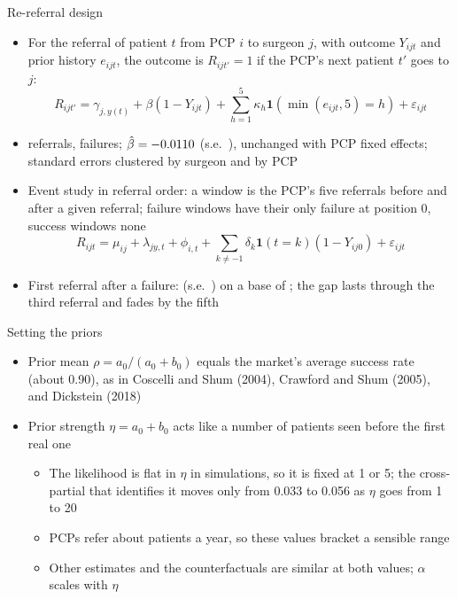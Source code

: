 \documentclass[aspectratio=169,11pt]{beamer}
\begin{document}
\begin{frame}[noframenumbering,label=bk-rereferral]{Re-referral design}
  \small
  \begin{itemize}\setlength{\itemsep}{3pt}
    \item For the referral of patient $t$ from PCP $i$ to surgeon $j$, with outcome $Y_{ijt}$ and prior history $e_{ijt}$, the outcome is $R_{ijt'} = 1$ if the PCP's next patient $t'$ goes to $j$:
    $$R_{ijt'} = \gamma_{j,y(t)} + \beta (1-Y_{ijt}) + \sum_{h=1}^{5} \kappa_h \mathbf{1}\left(\min(e_{ijt},5)=h\right) + \varepsilon_{ijt}$$
    \item \rereferEvents{} referrals, \rereferFailures{} failures; $\hat\beta = -0.0110{}$ (s.e.~\rereferSE{}), unchanged with PCP fixed effects; standard errors clustered by surgeon and by PCP
    \item Event study in referral order: a window is the PCP's five referrals before and after a given referral; failure windows have their only failure at position 0, success windows none
    $$R_{ijt} = \mu_{ij} + \lambda_{j y, t} + \phi_{i, t} + \sum_{k \neq -1} \delta_k \mathbf{1}(t=k) (1-Y_{ij0}) + \varepsilon_{ijt}$$
    \item First referral after a failure: \rereferESFirst{} (s.e.~\rereferESFirstSE{}) on a base of \rereferESBase{}; the gap lasts through the third referral and fades by the fifth
  \end{itemize}
\end{frame}

\begin{frame}[noframenumbering,label=bk-priors]{Setting the priors}
  \begin{itemize}\setlength{\itemsep}{9pt}
    \item Prior mean $\rho = a_0/(a_0+b_0)$ equals the market's average success rate (about 0.90), as in Coscelli and Shum (2004), Crawford and Shum (2005), and Dickstein (2018)
    \item Prior strength $\eta = a_0 + b_0$ acts like a number of patients seen before the first real one
      \begin{itemize}
        \item The likelihood is flat in $\eta$ in simulations, so it is fixed at 1 or 5; the cross-partial that identifies it moves only from 0.033 to 0.056 as $\eta$ goes from 1 to 20
        \item PCPs refer about \meanRefsPerPCP{} patients a year, so these values bracket a sensible range
        \item Other estimates and the counterfactuals are similar at both values; $\alpha$ scales with $\eta$
      \end{itemize}
  \end{itemize}
\end{frame}
\end{document}
